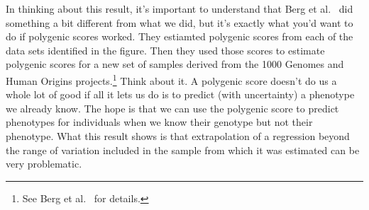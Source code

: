 \documentclass[12pt]{article}
\begin{document}
In thinking about this result, it's important to understand that Berg
et al.~\cite{Berg-etal-2018} did something a bit different from what
we did, but it's exactly what you'd want to do if polygenic scores
worked. They estiamted polygenic scores from each of the data sets
identified in the figure. Then they used those scores to estimate
polygenic scores for a new set of samples derived from the 1000
Genomes and Human Origins projects.\footnote{See Berg et
  al.~\cite{Berg-etal-2018} for details.} Think about it. A polygenic
score doesn't do us a whole lot of good if all it lets us do is to
predict (with uncertainty) a phenotype we already know. The hope is
that we can use the polygenic score to predict phenotypes for
individuals when we know their genotype but not their phenotype. What
this result shows is that extrapolation of a regression beyond the
range of variation included in the sample from which it was estimated
can be very problematic.




\ccLicense
\end{document}
